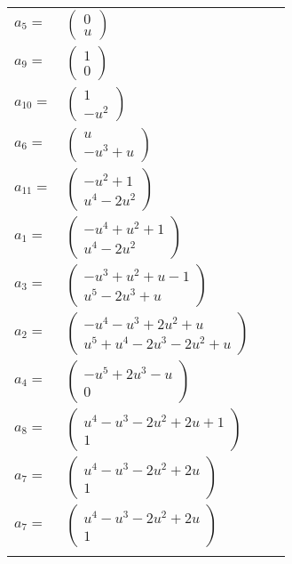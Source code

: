 \documentclass[1p]{elsarticle_modified}
\theoremstyle{definition}
\begin{document}
\begin{tabular}{m{7pt} m{180pt} m{7pt} m{180pt} }
\flushright $a_{5}=$&$\begin{pmatrix}0\\u\end{pmatrix}$ \\
\flushright $a_{9}=$&$\begin{pmatrix}1\\0\end{pmatrix}$ \\
\flushright $a_{10}=$&$\begin{pmatrix}1\\- u^2\end{pmatrix}$ \\
\flushright $a_{6}=$&$\begin{pmatrix}u\\- u^3+u\end{pmatrix}$ \\
\flushright $a_{11}=$&$\begin{pmatrix}- u^2+1\\u^4-2 u^2\end{pmatrix}$ \\
\flushright $a_{1}=$&$\begin{pmatrix}- u^4+u^2+1\\u^4-2 u^2\end{pmatrix}$ \\
\flushright $a_{3}=$&$\begin{pmatrix}- u^3+u^2+u-1\\u^5-2 u^3+u\end{pmatrix}$ \\
\flushright $a_{2}=$&$\begin{pmatrix}- u^4- u^3+2 u^2+u\\u^5+u^4-2 u^3-2 u^2+u\end{pmatrix}$ \\
\flushright $a_{4}=$&$\begin{pmatrix}- u^5+2 u^3- u\\0\end{pmatrix}$ \\
\flushright $a_{8}=$&$\begin{pmatrix}u^4- u^3-2 u^2+2 u+1\\1\end{pmatrix}$ \\
\flushright $a_{7}=$&$\begin{pmatrix}u^4- u^3-2 u^2+2 u\\1\end{pmatrix}$\\ \flushright $a_{7}=$&$\begin{pmatrix}u^4- u^3-2 u^2+2 u\\1\end{pmatrix}$\\&\end{tabular}
\end{document}
